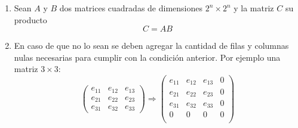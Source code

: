 \documentclass[12pt,letterpaper]{article}
\begin{document}
\begin{enumerate}
\item Sean $A$ y $B$ dos matrices cuadradas de dimensiones $2^n\times 2^n$ y la matriz $C$ su producto
\begin{equation*}
	C=AB
\end{equation*}
\item En caso de que no lo sean se deben agregar la cantidad de filas y columnas nulas necesarias para cumplir con la condición anterior. Por ejemplo una matriz $3\times3$:
\begin{equation*}
\left(
\begin{array}{ccc}
	e_{11} & e_{12} & e_{13}\\
    e_{21} & e_{22} & e_{23}\\
    e_{31} & e_{32} & e_{33}
\end{array}
\right)
\Rightarrow
\left(
\begin{array}{cccc}
	e_{11} & e_{12} & e_{13} & 0\\
    e_{21} & e_{22} & e_{23} & 0\\
    e_{31} & e_{32} & e_{33} & 0\\
    0 & 0 & 0 & 0\\
\end{array}
\right)
\end{equation*}
\end{enumerate}
\end{document}
